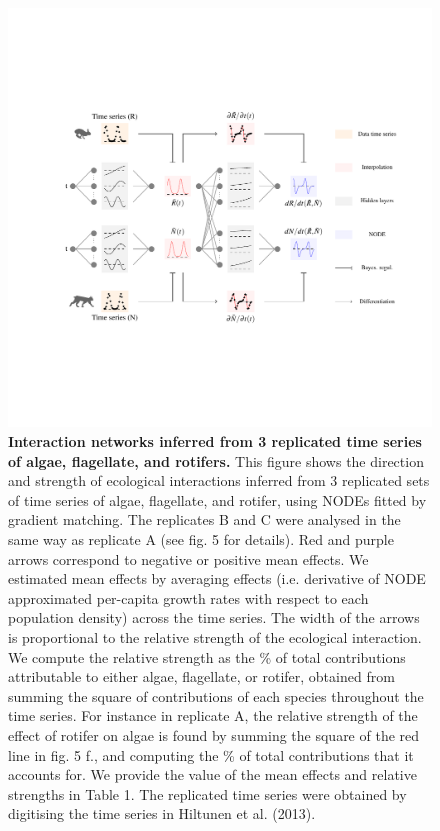 \documentclass[11pt, oneside]{article}
\begin{document}
\newpage
\begin{figure}[H]
\includegraphics[width=1\linewidth,page=6]{figures/main.pdf}
\caption{
    \textbf{Interaction networks inferred from 3 replicated time series of algae, flagellate, and rotifers.}
    This figure shows the direction and strength of ecological interactions inferred from 3 replicated sets of time series of algae, flagellate, and rotifer, using NODEs fitted by gradient matching.
    The replicates B and C were analysed in the same way as replicate A (see fig. 5 for details).
    Red and purple arrows correspond to negative or positive mean effects. 
    We estimated mean effects by averaging effects (i.e. derivative of NODE approximated per-capita growth rates with respect to each population density) across the time series.
    The width of the arrows is proportional to the relative strength of the ecological interaction. 
    We compute the relative strength as the \% of total contributions attributable to either algae, flagellate, or rotifer, obtained from summing the square of contributions of each species throughout the time series.
    For instance in replicate A, the relative strength of the effect of rotifer on algae is found by summing the square of the red line in fig. 5 f., and computing the \% of total contributions that it accounts for.
    We provide the value of the mean effects and relative strengths in Table 1.
    The replicated time series were obtained by digitising the time series in Hiltunen et al. (2013).
}
\end{figure}
\newpage
\end{document}

